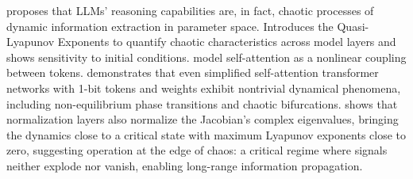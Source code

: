 \documentclass[a4paper,12pt]{article}
\begin{document}
\cite{li2025cognitive_activation} proposes that LLMs' reasoning capabilities are, in fact, chaotic processes of dynamic information extraction in parameter space.  Introduces the Quasi-Lyapunov Exponents to quantify chaotic characteristics across model layers and shows sensitivity to initial conditions.
\cite{geshkovski2025mathematicalperspectivetransformers} model self-attention as a nonlinear coupling between tokens.
\cite{dynamicalmeanfieldtheoryselfattention} demonstrates that even simplified self-attention transformer networks with 1-bit tokens and weights exhibit nontrivial dynamical phenomena, including non-equilibrium phase transitions and chaotic bifurcations. 
\cite{tomihari2025recurrent_self_attention_dynamics} shows that normalization layers also normalize the Jacobian's complex eigenvalues, bringing the dynamics close to a critical state with maximum Lyapunov exponents close to zero, suggesting operation at the edge of chaos: a critical regime where signals neither explode nor vanish, enabling long-range information propagation.
\end{document}
